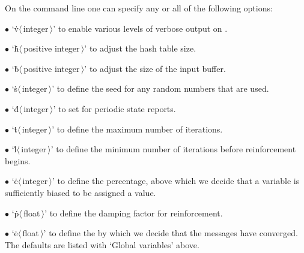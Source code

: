 On the command line one can specify any or all of the
following options:
\smallskip
\item{$\bullet$}
`\.v$\langle\,$integer$\,\rangle$' to enable various levels of verbose
output on .
\item{$\bullet$}
`\.h$\langle\,$positive integer$\,\rangle$' to adjust the hash table size.
\item{$\bullet$}
`\.b$\langle\,$positive integer$\,\rangle$' to adjust the size of the input
buffer.
\item{$\bullet$}
`\.s$\langle\,$integer$\,\rangle$' to define the seed for any random numbers
that are used.
\item{$\bullet$}
`\.d$\langle\,$integer$\,\rangle$' to set  for periodic state
reports.
\item{$\bullet$}
`\.t$\langle\,$integer$\,\rangle$' to define the maximum number of iterations.
\item{$\bullet$}
`\.l$\langle\,$integer$\,\rangle$' to define the minimum number of iterations
before reinforcement begins.
\item{$\bullet$}
`\.c$\langle\,$integer$\,\rangle$' to define the 
percentage,
above which we decide that a variable is sufficiently biased to be assigned
a value.
\item{$\bullet$}
`\.p$\langle\,$float$\,\rangle$' to define the damping factor 
for reinforcement.
\item{$\bullet$}
`\.e$\langle\,$float$\,\rangle$' to define the 
by which we decide that the messages have converged.
\smallskip\noindent
The defaults are listed with `Global variables' above.

